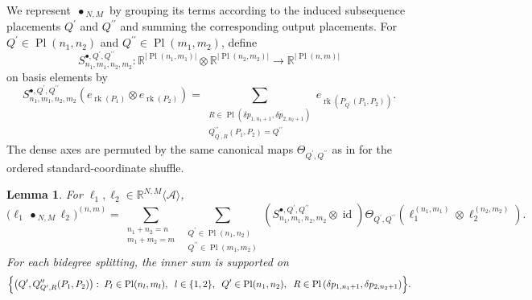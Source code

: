 \documentclass{amsart}
\newtheorem{lemma}[theorem]{Lemma}
\theoremstyle{definition}
\theoremstyle{remark}
\newcommand{\gammashuffle}{{\,\bullet\,}}
\begin{document}
We represent $\gammashuffle_{N,M}$ by grouping its terms according to the
induced subsequence placements $Q^{\prime}$ and $Q^{\prime\prime}$ and
summing the corresponding output placements. For
$Q^{\prime}\in\operatorname{Pl}(n_1,n_2)$ and
$Q^{\prime\prime}\in\operatorname{Pl}(m_1,m_2)$, define
\[
    S^{\bullet,Q^{\prime},Q^{\prime\prime}}_{n_1,m_1,n_2,m_2}
    \colon
    \mathbb{R}^{|\operatorname{Pl}(n_1,m_1)|}
    \otimes
    \mathbb{R}^{|\operatorname{Pl}(n_2,m_2)|}
    \longrightarrow
    \mathbb{R}^{|\operatorname{Pl}(n,m)|}
\]
on basis elements by
\[
    S^{\bullet,Q^{\prime},Q^{\prime\prime}}_{n_1,m_1,n_2,m_2}
    \left(
        e_{\operatorname{rk}(P_1)}
        \otimes
        e_{\operatorname{rk}(P_2)}
    \right)
    =
    \sum_{\substack{
        R\in
        \operatorname{Pl}
        \left(
            \delta p_{1,n_1+1},
            \delta p_{2,n_2+1}
        \right)\\
        Q^{\prime\prime}_{Q^{\prime},R}(P_1,P_2)
        =
        Q^{\prime\prime}
    }}
    e_{\operatorname{rk}
        \left(
            P_{Q^{\prime}}(P_1,P_2)
        \right)}.
\]
The dense axes are permuted by the same canonical maps
$\Theta_{Q^{\prime},Q^{\prime\prime}}$ as in
 for the ordered standard-coordinate shuffle.

\begin{lemma}
\label{lem:gamma_shuffle_units}
For
$\ell_1,\ell_2\in
\mathbb{R}^{N,M}\langle\mathcal{A}\rangle$,
\[
    \bigl(
        \ell_1\gammashuffle_{N,M}\ell_2
    \bigr)^{(n,m)}
    =
    \sum_{\substack{
        n_1+n_2=n\\
        m_1+m_2=m
    }}
    \;
    \sum_{\substack{
        Q^{\prime}\in\operatorname{Pl}(n_1,n_2)\\
        Q^{\prime\prime}\in\operatorname{Pl}(m_1,m_2)
    }}
    \left(
        S^{\bullet,Q^{\prime},Q^{\prime\prime}}_{n_1,m_1,n_2,m_2}
        \otimes
        \operatorname{id}
    \right)
    \Theta_{Q^{\prime},Q^{\prime\prime}}
    \left(
        \ell_1^{(n_1,m_1)}
        \otimes
        \ell_2^{(n_2,m_2)}
    \right).
\]
For each bidegree splitting, the inner sum is supported on
\[
    \Bigl\{
        \left(
            Q^{\prime},
            Q^{\prime\prime}_{Q^{\prime},R}(P_1,P_2)
        \right)
        :\;
        P_l\in\operatorname{Pl}(n_l,m_l),
        \;\; l\in\{1,2\},
        \;\;
        Q^{\prime}\in\operatorname{Pl}(n_1,n_2),
        \;\;
        R\in
        \operatorname{Pl}
        \left(
            \delta p_{1,n_1+1},
            \delta p_{2,n_2+1}
        \right)
    \Bigr\}.
\]
\end{lemma}
\end{document}
